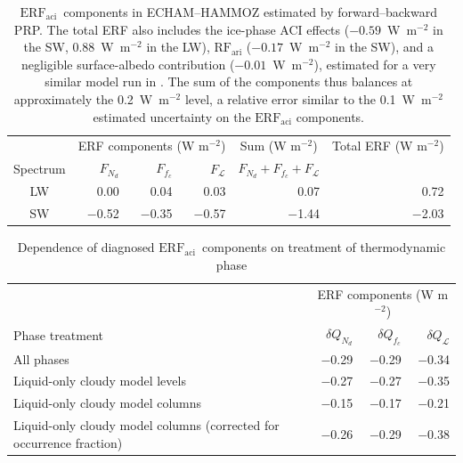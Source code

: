 \documentclass[acp, manuscript]{copernicus}\usepackage[]{graphicx}\usepackage[]{color}
\newcommand\nd{\ensuremath{N_d}}
\newcommand\cdnc{\nd}
\newcommand\lwp{\ensuremath{\mathcal L}}
\newcommand\fc{\ensuremath{f_c}}
\newcommand\cf{\fc}
\newcommand\erfaci{\ensuremath{\text{ERF}_\text{aci}}}
\newcommand\rfari{\ensuremath{\text{RF}_\text{ari}}}
\begin{document}
\begin{table}[t]
  \caption{\erfaci\ components in ECHAM--HAMMOZ estimated by forward--backward PRP.
    The total ERF also includes the ice-phase ACI effects ($-0.59$~W~m$^{-2}$ in
    the SW, $0.88$~W~m$^{-2}$ in the LW), \rfari{} ($-0.17$~W~m$^{-2}$ in the SW),
    and a negligible surface-albedo contribution ($-0.01$~W~m$^{-2}$), estimated
    for a very similar model run in \citet{Gryspeerdt2019b}.  The sum of the
    components thus balances at approximately the 0.2~W~m$^{-2}$ level, a
    relative error similar to the 0.1~W~m$^{-2}$ estimated uncertainty on the
    \erfaci{} components.}
  \label{tab:echam-ham}
  \centering
  \begin{tabular}{c|rrr|r|r}
  \hline\hline
    & \multicolumn{3}{c|}{ERF components (W m$^{-2}$)}
    & \multicolumn{1}{c|}{Sum (W m$^{-2}$)} 
    & \multicolumn{1}{c}{Total ERF (W m$^{-2}$)} \\


Spectrum & $F_{\cdnc}$ & $F_{\cf}$ & $F_{\lwp}$ & \multicolumn{1}{c|}{$F_{\cdnc} + F_{\cf} + F_{\lwp}$} &   \\ 
  \hline
LW & 0.00 & 0.04 & 0.03 & 0.07 & 0.72 \\ 
  SW & $-$0.52 & $-$0.35 & $-$0.57 & $-$1.44 & $-$2.03 \\ 
   \hline
\hline

  \end{tabular}
\end{table}

\clearpage

\begin{table}[t]
  \caption{Dependence of diagnosed \erfaci\ components on treatment of
    thermodynamic phase}
  \label{tab:phase}
  \centering
  \begin{tabular}{l|rrr}
  \hline\hline
    & \multicolumn{3}{c}{ERF components (W m$^{-2}$)}\\
Phase treatment & $\delta Q_{\cdnc}$ & $\delta Q_{\cf}$ & $\delta Q_{\lwp}$ \\ 
  \hline
All phases & $-$0.29 & $-$0.29 & $-$0.34 \\ 
  Liquid-only cloudy model levels & $-$0.27 & $-$0.27 & $-$0.35 \\ 
  Liquid-only cloudy model columns & $-$0.15 & $-$0.17 & $-$0.21 \\ 
  Liquid-only cloudy model columns (corrected for occurrence fraction) & $-$0.26 & $-$0.29 & $-$0.38 \\ 
   \hline
\hline

  \end{tabular}
\end{table}
\end{document}
